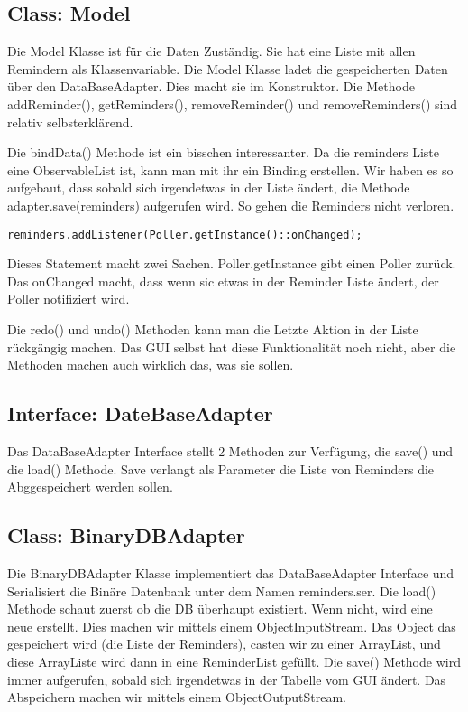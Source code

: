 \subsection{Class: Model}
Die Model Klasse ist für die Daten Zuständig. Sie hat eine Liste mit allen Remindern als Klassenvariable. Die Model Klasse ladet die gespeicherten Daten über den DataBaseAdapter.
Dies macht sie im Konstruktor. Die Methode addReminder(), getReminders(), removeReminder() und removeReminders() sind relativ selbsterklärend.

Die bindData() Methode ist ein bisschen interessanter. Da die reminders Liste eine ObservableList ist, kann man mit ihr ein Binding erstellen. Wir haben es so aufgebaut, dass sobald
sich irgendetwas in der Liste ändert, die Methode adapter.save(reminders) aufgerufen wird. So gehen die Reminders nicht verloren.

\begin{lstlisting}
reminders.addListener(Poller.getInstance()::onChanged);
\end{lstlisting}
Dieses Statement macht zwei Sachen. Poller.getInstance gibt einen Poller zurück. Das onChanged macht, dass wenn sic etwas in der Reminder Liste ändert, der Poller notifiziert wird.

Die redo() und undo() Methoden kann man die Letzte Aktion in der Liste rückgängig machen. Das GUI selbst hat diese Funktionalität noch nicht, aber die Methoden machen auch wirklich das, was sie sollen.


\subsection{Interface: DateBaseAdapter}
Das DataBaseAdapter Interface stellt 2 Methoden zur Verfügung, die save() und die load() Methode. Save verlangt als Parameter die Liste von Reminders die Abggespeichert werden
sollen.

\subsection{Class: BinaryDBAdapter}
Die BinaryDBAdapter Klasse implementiert das DataBaseAdapter Interface und Serialisiert die Binäre Datenbank unter dem Namen reminders.ser. Die load() Methode schaut zuerst ob die DB
überhaupt existiert. Wenn nicht, wird eine neue erstellt. Dies machen wir mittels einem ObjectInputStream. Das Object das gespeichert wird (die Liste der Reminders),
casten wir zu einer ArrayList, und diese ArrayListe wird dann in eine ReminderList gefüllt.
Die save() Methode wird immer aufgerufen, sobald sich irgendetwas in der Tabelle vom GUI ändert. Das Abspeichern machen wir mittels einem ObjectOutputStream.

